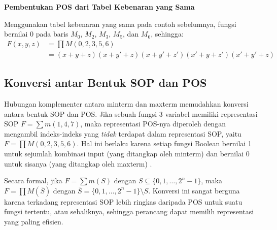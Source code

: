 \begin{contoh}
\textbf{Pembentukan POS dari Tabel Kebenaran yang Sama}

Menggunakan tabel kebenaran yang sama pada contoh sebelumnya, fungsi bernilai 0 pada baris $M_0$, $M_2$, $M_3$, $M_5$, dan $M_6$, sehingga:
\begin{align*}
F(x,y,z) &= \prod M(0, 2, 3, 5, 6) \\
          &= (x+y+z)(x+y'+z)(x+y'+z')(x'+y+z')(x'+y'+z)
\end{align*}
\end{contoh}

\subsection{Konversi antar Bentuk SOP dan POS}

Hubungan komplementer antara minterm dan maxterm memudahkan konversi antara bentuk SOP dan POS. Jika sebuah fungsi 3 variabel memiliki representasi SOP $F = \sum m(1, 4, 7)$, maka representasi POS-nya diperoleh dengan mengambil indeks-indeks yang \emph{tidak} terdapat dalam representasi SOP, yaitu $F = \prod M(0, 2, 3, 5, 6)$. Hal ini berlaku karena setiap fungsi Boolean bernilai 1 untuk sejumlah kombinasi input (yang ditangkap oleh minterm) dan bernilai 0 untuk sisanya (yang ditangkap oleh maxterm) \cite{rosen2019}.

Secara formal, jika $F = \sum m(S)$ dengan $S \subseteq \{0, 1, \ldots, 2^n - 1\}$, maka $F = \prod M(\bar{S})$ dengan $\bar{S} = \{0, 1, \ldots, 2^n - 1\} \setminus S$. Konversi ini sangat berguna karena terkadang representasi SOP lebih ringkas daripada POS untuk suatu fungsi tertentu, atau sebaliknya, sehingga perancang dapat memilih representasi yang paling efisien.
